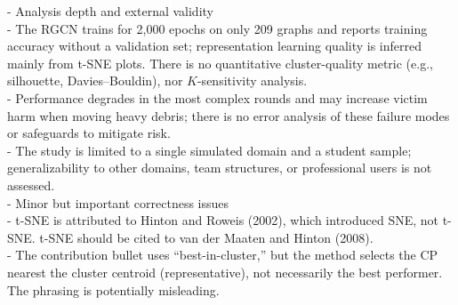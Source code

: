 \documentclass[letterpaper]{article} %
\begin{document}
- Analysis depth and external validity\\
\hspace*{1em}- The RGCN trains for 2,000 epochs on only 209 graphs and reports training accuracy without a validation set; representation learning quality is inferred mainly from t-SNE plots. There is no quantitative cluster-quality metric (e.g., silhouette, Davies–Bouldin), nor $K$-sensitivity analysis.\\
\hspace*{1em}- Performance degrades in the most complex rounds and may increase victim harm when moving heavy debris; there is no error analysis of these failure modes or safeguards to mitigate risk.\\
\hspace*{1em}- The study is limited to a single simulated domain and a student sample; generalizability to other domains, team structures, or professional users is not assessed.\\[0.25em]
- Minor but important correctness issues\\
\hspace*{1em}- t-SNE is attributed to Hinton and Roweis (2002), which introduced SNE, not t-SNE. t-SNE should be cited to van der Maaten and Hinton (2008).\\
\hspace*{1em}- The contribution bullet uses “best-in-cluster,” but the method selects the CP nearest the cluster centroid (representative), not necessarily the best performer. The phrasing is potentially misleading.
\end{document}
